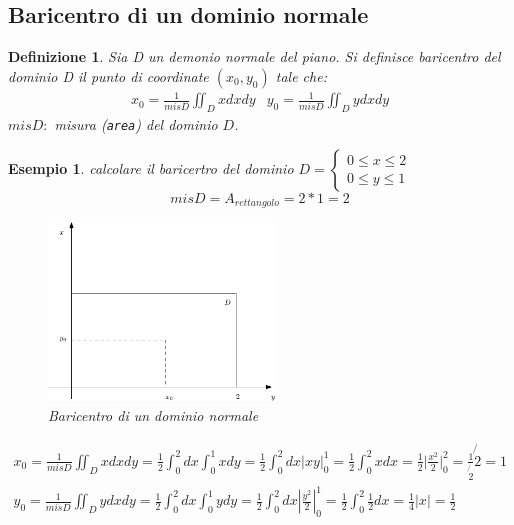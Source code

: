 \documentclass{book}
\newtheorem{defi}{Definizione}
\newtheorem{esempio}{Esempio}
\newcommand{\abs}[1]{\lvert#1\rvert}
\begin{document}
\subsection{Baricentro di un dominio normale}
\begin{defi}
  Sia D un demonio normale del piano. Si definisce {\color{red}baricentro del dominio} D il punto di
  coordinate $(x_0,y_0)$ tale che:
  \begin{equation*}
    \begin{matrix}
      x_0=\frac{1}{mis D} \iint_D xdxdy & y_0=\frac{1}{mis D} \iint_D ydxdy
    \end{matrix}
  \end{equation*}
  $mis D:$ misura ({\tt area}) del dominio $D$.
\end{defi}
\begin{esempio}
  calcolare il baricertro del dominio $D=\begin{cases}
                                           0\leq x\leq 2\\
                                           0\leq y\leq 1
                                         \end{cases}$
  \begin{equation*}
    mis D=A_{rettangolo}=2*1=2
  \end{equation*}
  \begin{figure}[ht]
    \centering
    \includegraphics[width=6cm]{img/finiti/baricentrodiundominionormale.eps}
    \caption{Baricentro di un dominio normale}
  \end{figure}
  \begin{equation*}
    \begin{matrix}
      x_0=\frac{1}{mis D}\iint_D xdxdy=\frac{1}{2}\int_0^2dx\int_0^1xdy=\frac{1}{2}\int^2_0dx\abs{xy}_0^1= \frac{1}{2}\int_0^2xdx=\frac{1}{2}\abs{\frac{x^2}{2}}_0^2=\frac{1}{\not{2}}\not{2}=1\\
      y_0=\frac{1}{mis D}\iint_D ydxdy=\frac{1}{2}\int_0^2dx\int_0^1ydy=\frac{1}{2}\int_0^2dx\left|\frac{y^2}{2}\right|^1_0=\frac{1}{2}\int^2_0\frac{1}{2}dx=\frac{1}{4}\left|x\right|=\frac{1}{2}

\end{matrix}
\end{equation*}
\end{esempio}
\end{document}
